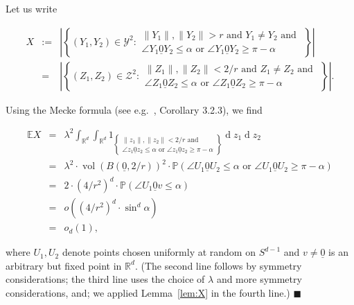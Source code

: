 \documentclass[11pt]{article}%
\newenvironment{proof}{\vspace{1ex}\noindent{\bf Proof.}}{\hspace*{\fill}$\blacksquare$\vspace{1ex}}
\newcommand{\Ycal}[0]{\ensuremath{{\mathcal Y}}}
\newcommand{\Zcal}[0]{\ensuremath{{\mathcal Z}}}
\newcommand{\eR}[0]{\ensuremath{ \mathbb R}}
\newcommand{\norm}[1]{\ensuremath{\|#1\|}}
\newcommand{\Pee}[0]{\ensuremath{{\mathbb P}}}
\newcommand{\Ee}[0]{\ensuremath{{\mathbb E}}}
\newcommand{\orig}{\underline{0}}
\DeclareMathOperator{\vol}{vol}
\DeclareMathOperator{\dd}{d}
\begin{document}
\begin{proof} Let us write 

$$ \begin{array}{rcl} X 
& := & \displaystyle 
\left|\left\{ (Y_1,Y_2) \in \Ycal^2 : \begin{array}{l} \norm{Y_1},\norm{Y_2} > r \text{ and } Y_1\neq Y_2 \text{ and } \\
\angle Y_1{\orig}Y_2 \leq \alpha \text{ or } \angle Y_1{\orig}Y_2 \geq \pi-\alpha\end{array} \right\}\right| \\[2ex]
& = & \displaystyle 
\left|\left\{ (Z_1, Z_2) \in \Zcal^2 : \begin{array}{l} \norm{Z_1},\norm{Z_2} < 2/r \text{ and } Z_1\neq Z_2 \text{ and } \\
\angle Z_1{\orig}Z_2 \leq \alpha \text{ or } \angle Z_1{\orig}Z_2 \geq \pi-\alpha\end{array} \right\}\right|. 
\end{array} $$

Using the Mecke formula (see e.g.~\cite{SchneiderWeil}, Corollary 3.2.3), we find

$$ \begin{array}{rcl} \Ee X & = & \displaystyle 
\lambda^2 \int_{\eR^d}\int_{\eR^d} 1_{\left\{\begin{array}{l} \norm{z_1},\norm{z_2} < 2/r \text{ and }  \\
\angle z_1{\orig}z_2 \leq \alpha \text{ or } \angle z_1{\orig}z_2 \geq \pi-\alpha\end{array} \right\}}
\dd z_1 \dd z_2 \\[5ex]
& = & \displaystyle \lambda^2 \cdot \vol( B(\orig,2/r) )^2 \cdot \Pee( \angle U_1\orig U_2 \leq \alpha \text{ or }
\angle U_1\orig U_2 \geq \pi-\alpha ) \\[2ex]
& = & 2 \cdot (4/r^2)^{d} \cdot \Pee( \angle U_1\orig v \leq \alpha ) \\[2ex]
& = & o\left( (4/r^2)^{d} \cdot \sin^d \alpha \right) \\[2ex]
& = & o_d(1),   
 \end{array} $$
 
\noindent
where $U_1,U_2$ denote points chosen uniformly at random on $S^{d-1}$ and $v \neq \orig$ is an arbitrary 
but fixed point in $\eR^d$. 
(The second line follows by symmetry considerations; the third line uses the choice of $\lambda$ and 
more symmetry considerations, and; 
we applied Lemma~\ref{lem:X} in the fourth line.)
\end{proof}
\end{document}
